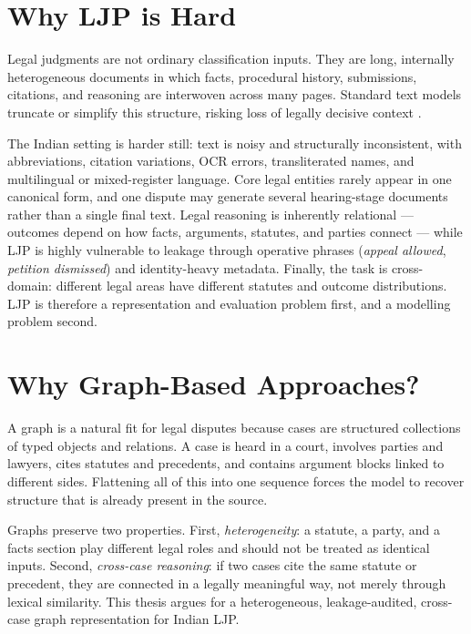 \section{Why LJP is Hard}

Legal judgments are not ordinary classification inputs. They are long, internally heterogeneous documents in which facts, procedural history, submissions, citations, and reasoning are interwoven across many pages. Standard text models truncate or simplify this structure, risking loss of legally decisive context \cite{chalkidis2020legalbert, mamakas2022longlegal}.

The Indian setting is harder still: text is noisy and structurally inconsistent, with abbreviations, citation variations, OCR errors, transliterated names, and multilingual or mixed-register language. Core legal entities rarely appear in one canonical form, and one dispute may generate several hearing-stage documents rather than a single final text. Legal reasoning is inherently relational --- outcomes depend on how facts, arguments, statutes, and parties connect --- while LJP is highly vulnerable to leakage through operative phrases (\emph{appeal allowed}, \emph{petition dismissed}) and identity-heavy metadata. Finally, the task is cross-domain: different legal areas have different statutes and outcome distributions. LJP is therefore a representation and evaluation problem first, and a modelling problem second.

\section{Why Graph-Based Approaches?}

A graph is a natural fit for legal disputes because cases are structured collections of typed objects and relations. A case is heard in a court, involves parties and lawyers, cites statutes and precedents, and contains argument blocks linked to different sides. Flattening all of this into one sequence forces the model to recover structure that is already present in the source.

Graphs preserve two properties. First, \emph{heterogeneity}: a statute, a party, and a facts section play different legal roles and should not be treated as identical inputs. Second, \emph{cross-case reasoning}: if two cases cite the same statute or precedent, they are connected in a legally meaningful way, not merely through lexical similarity. This thesis argues for a heterogeneous, leakage-audited, cross-case graph representation for Indian LJP.

